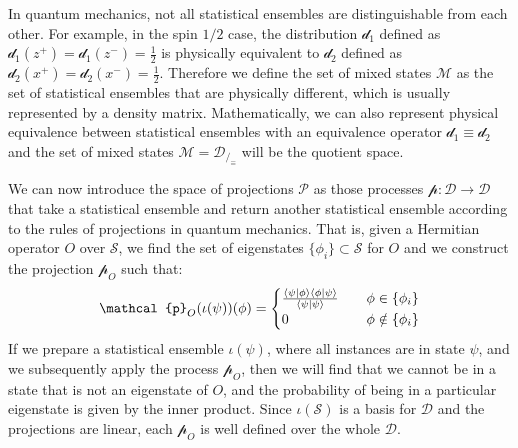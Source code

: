 \documentclass[applsci,article,submit,moreauthors,pdftex]{Definitions/mdpi}
\begin{document}
In quantum mechanics, not all statistical ensembles are distinguishable from each other. For example, in the spin $1/2$ case, the distribution $\mathcal{d}_1$ defined as $\mathcal{d}_1(z^+)=\mathcal{d}_1(z^-)=\frac{1}{2}$ is physically equivalent to $\mathcal{d}_2$ defined as $\mathcal{d}_2(x^+)=\mathcal{d}_2(x^-)=\frac{1}{2}$. Therefore we define the set of mixed states $\mathcal{M}$ as the set of statistical ensembles that are physically different, which is usually represented by a density matrix. Mathematically, we can also represent physical equivalence between statistical ensembles with an equivalence operator $\mathcal{d}_1 \equiv \mathcal{d}_2$ and the set of mixed states $\mathcal{M} = \mathcal{D}_{/_\equiv}$ will be the quotient space.

We can now introduce the space of projections $\mathcal{P}$ as those processes $\mathcal{p} : \mathcal{D} \to \mathcal{D}$ that take a statistical ensemble and return another statistical ensemble according to the rules of projections in quantum mechanics. That is, given a Hermitian operator $O$ over $\mathcal{S}$, we find the set of eigenstates $\{\phi_i\} \subset \mathcal{S}$ for $O$ and we construct the projection $\mathcal{p}_O$ such that:
\begin{equation}\label{transition_probability}
\mathcal{p}_O(\iota(\psi))(\phi) = 
\begin{cases}
\frac{\braket{\psi | \phi} \braket{\phi|\psi}}{\braket{\psi|\psi}} &\quad\phi \in \{\phi_i\}\\
0 &\quad\phi \notin \{\phi_i\}\\
\end{cases}
\end{equation}
If we prepare a statistical ensemble $\iota(\psi)$, where all instances are in state $\psi$, and we subsequently apply the process $\mathcal{p}_O$, then we will find that we cannot be in a state that is not an eigenstate of $O$, and the probability of being in a particular eigenstate is given by the inner product. Since $\iota(\mathcal{S})$ is a basis for $\mathcal{D}$ and the projections are linear, each $\mathcal{p}_O$ is well defined over the whole $\mathcal{D}$.
\end{document}
